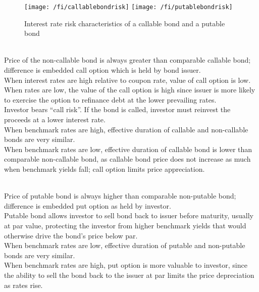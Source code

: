 \begin{figure}[H]
\centering
\texttt{[image: /fi/callablebondrisk]} \hfill
\texttt{[image: /fi/putablebondrisk]}
\caption{Interest rate risk characteristics of a callable bond and a putable bond}
\end{figure}

\begin{remark} \\
Price of the non-callable bond is always greater than comparable callable bond; difference is embedded call option which is held by bond issuer.\\
When interest rates are high relative to coupon rate, value of call option is low.\\
When rates are low, the value of the call option is high since issuer is more likely to exercise the option to refinance debt at the lower prevailing rates.\\
Investor bears “call risk”. If the bond is called, investor must reinvest the proceeds at a lower interest rate.\\
When benchmark rates are high, effective duration of callable and non-callable bonds are very similar.\\
When benchmark rates are low, effective duration of callable bond is lower than comparable non-callable bond, as callable bond price does not increase as much when benchmark yields fall; call option limits price appreciation.
\end{remark}

\begin{remark} \\
Price of putable bond is always higher than comparable non-putable bond; difference is embedded put option as held by investor.\\
Putable bond allows investor to sell bond back to issuer before maturity, usually at par value, protecting the investor from higher benchmark yields that would otherwise drive the bond’s price below par.\\
When benchmark rates are low, effective duration of putable and non-putable bonds are very similar.\\
When benchmark rates are high, put option is more valuable to investor, since the ability to sell the bond back to the issuer at par limits the price depreciation as rates rise.
\end{remark}

